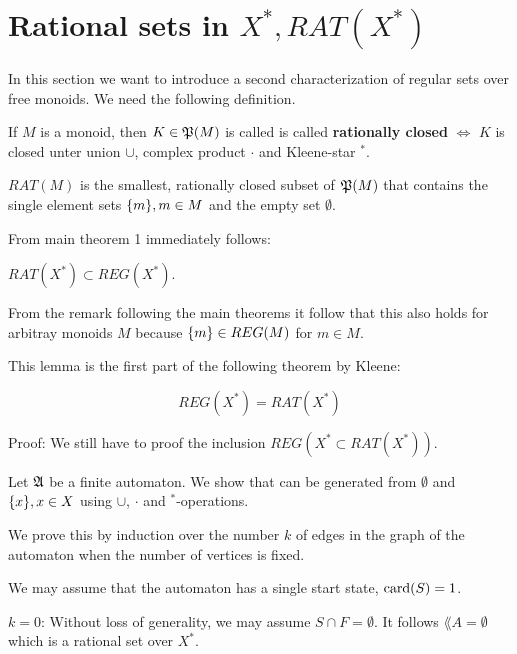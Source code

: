 \section{Rational sets in $X^*, RAT(X^*)$}

In this section we want to introduce a second characterization of regular sets
over free monoids. We need the following definition.

\begin{definition}
If $M$ is a monoid, then $K \in \mathfrak{P}(M)$ is called is called {\bf rationally
closed} $\Leftrightarrow$ $K$ is closed unter union $\cup$, complex product $\cdot$ and Kleene-star $^*$.
\end{definition}

\begin{definition}
$RAT(M)$ is the smallest, rationally closed subset of $\mathfrak{P}(M)$ that
contains the single element sets $\mbox{$\{m\}$}, m \in M$ and the empty set
$\emptyset$.
\end{definition}

From main theorem 1 immediately follows:

\begin{lemma}
$RAT(X^*) \subset REG(X^*)$.
\end{lemma}

From the remark following the main theorems it follow that this also holds for
arbitray monoids $M$ because $\mbox{$\{m\}$} \in REG(M)$ for $m \in M$.

This lemma is the first part of the following theorem by Kleene:

\begin{theorem}[Kleene]
\[ REG(X^*) = RAT(X^*) \]
\end{theorem}

Proof: We still have to proof the inclusion $REG(X^* \subset RAT(X^*))$.

Let $\mbox{$\mathfrak{A}$}$ be a finite automaton. We show that  can be generated
from $\emptyset$ and $\mbox{$\{x\}$}, x \in X$	using $\cup$, $\cdot$ and
$^*$-operations.

We prove this by induction over the number $k$ of edges in the graph of the
automaton when the number of vertices is fixed.

We may assume that the automaton has a single start state, $\mathrm{card}(S) = 1$.

$k = 0$: Without loss of generality, we may assume $S \cap F = \emptyset$. It
follows $\lang{A} = \emptyset$ which is a rational set over $X^*$.

